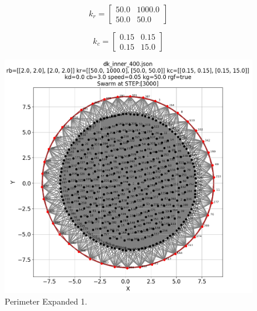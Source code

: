 \documentclass[12pt,a4paper]{IEEEtran}
\newcommand{\kc}{\mathit{k_c}}
\newcommand{\kr}{\mathit{k_r}}
\begin{document}
\begin{equation}\label{eq:krexp2}
\kr = 
\begin{bmatrix}
50.0 & 1000.0\\
50.0 & 50.0
\end{bmatrix}
\end{equation}

\begin{equation}\label{eq:kcexp2}
\kc = 
\begin{bmatrix}
0.15 & 0.15\\
0.15 & 15.0
\end{bmatrix}
\end{equation}

\begin{figure}[H]
	\begin{center}
		\includegraphics[width=1.0\linewidth]{figures/inner1}
	\end{center}
	\caption{Perimeter Expanded 1. \label{fig:perimExpand1}}
\end{figure}
\end{document}
